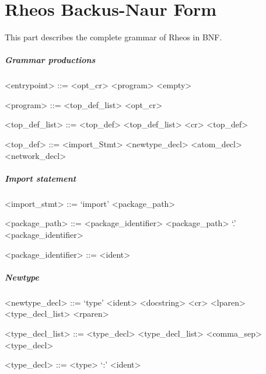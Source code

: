 \chapter{Rheos Backus-Naur Form}\label{ch:bnf}
This part describes the complete grammar of Rheos in BNF.


\paragraph{Grammar productions}

\begin{grammar}
  <entrypoint> ::= <opt_cr> <program>
  \alt <empty>

  <program> ::= <top_def_list> <opt_cr>

  <top_def_list> ::= <top_def>
  \alt <top_def_list> <cr> <top_def>

  <top_def> ::= <import_Stmt>
  \alt <newtype_decl>
  \alt <atom_decl>
  \alt <network_decl>
\end{grammar}


\paragraph{Import statement}

\begin{grammar}
  <import_stmt> ::= `import' <package_path>

  <package_path> ::= <package_identifier>
  \alt <package_path> `.' <package_identifier>

  <package_identifier> ::= <ident>
\end{grammar}


\paragraph{Newtype}

\begin{grammar}
  <newtype_decl> ::= `type' <ident> <docstring> <cr> <lparen>
  <type_decl_list> <rparen>

  <type_decl_list> ::= <type_decl>
  \alt <type_decl_list> <comma_sep> <type_decl>

  <type_decl> ::= <type> `:' <ident>
\end{grammar}


